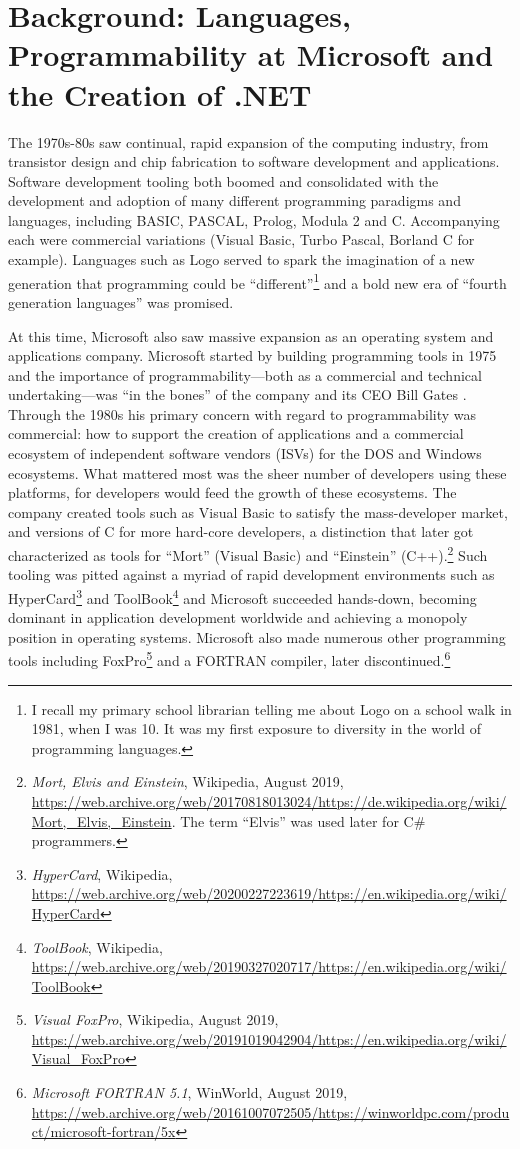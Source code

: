 \documentclass[acmsmall]{acmart}\settopmatter{}
\begin{document}
\section*{Background: Languages, Programmability at Microsoft and the Creation of .NET}

The 1970s-80s saw continual, rapid expansion of the computing industry, from transistor design and chip fabrication to
software development and applications. Software development tooling both boomed and consolidated with the development
and adoption of many different programming paradigms and languages, including BASIC, PASCAL, Prolog, Modula 2 and C.  Accompanying
each were commercial variations (Visual Basic, Turbo Pascal, Borland C for example). Languages such as Logo served to spark
the imagination of a new generation that programming could be “different”\footnote{I recall my primary school librarian telling me
about Logo on a school walk in 1981, when I was 10. It was my first exposure to diversity in the world of programming languages.} and a
bold new era of “fourth generation languages” was promised. 

At this time, Microsoft also saw massive expansion as an operating system and applications company.  Microsoft started by building
programming tools in 1975 and the importance of programmability---both as a commercial and technical undertaking---was “in the bones” of
the company and its CEO Bill Gates \citep{MicrosoftHistoryWikipedia}.  Through the 1980s his primary concern with regard to programmability was commercial: how
to support the creation of applications and a commercial ecosystem of independent software vendors (ISVs) for the DOS and
Windows ecosystems.  What mattered most was the sheer number of developers using these platforms, for developers would
feed the growth of these ecosystems.  The company created tools such as Visual Basic to satisfy the mass-developer
market, and versions of C for more hard-core developers, a distinction that later got characterized as
tools for “Mort” (Visual Basic) and “Einstein” (C++).\footnote{\textit{Mort, Elvis and Einstein}, Wikipedia, August 2019, \url{https://web.archive.org/web/20170818013024/https://de.wikipedia.org/wiki/Mort,_Elvis,_Einstein}.
The term “Elvis” was used later for C\# programmers.}  Such tooling was pitted against a myriad of rapid development
environments such as HyperCard\footnote{\textit{HyperCard}, Wikipedia, \url{https://web.archive.org/web/20200227223619/https://en.wikipedia.org/wiki/HyperCard}}  and
ToolBook\footnote{\textit{ToolBook}, Wikipedia, \url{https://web.archive.org/web/20190327020717/https://en.wikipedia.org/wiki/ToolBook}} and Microsoft succeeded
hands-down, becoming dominant in application development worldwide and achieving a monopoly position in operating
systems.  Microsoft also made numerous other programming tools including FoxPro\footnote{\textit{Visual FoxPro},
Wikipedia, August 2019, \url{https://web.archive.org/web/20191019042904/https://en.wikipedia.org/wiki/Visual_FoxPro}} and a FORTRAN compiler, later
discontinued.\footnote{\textit{Microsoft FORTRAN 5.1}, WinWorld, August 2019, \url{https://web.archive.org/web/20161007072505/https://winworldpc.com/product/microsoft-fortran/5x}}
\end{document}
